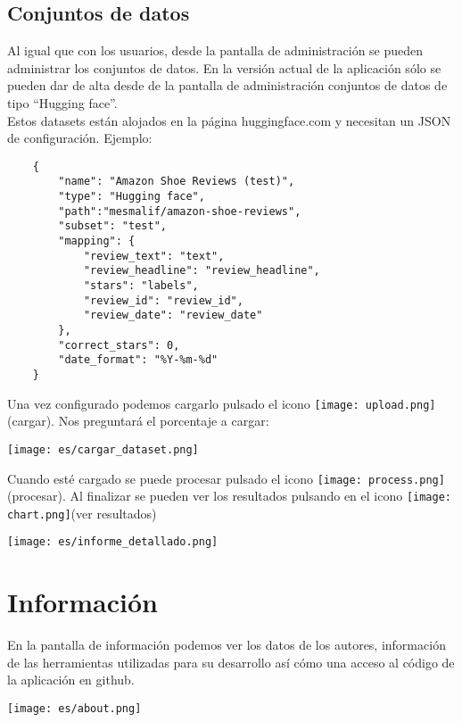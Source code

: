 \documentclass{ol-softwaremanual}
\begin{document}
\subsection{Conjuntos de datos}
Al igual que con los usuarios, desde la pantalla de administración se pueden administrar los conjuntos de datos.
En la versión actual de la aplicación sólo se pueden dar de alta desde de la pantalla de administración conjuntos de datos de tipo ``Hugging face''. \\Estos datasets están alojados en la página huggingface.com y necesitan un JSON de configuración.
Ejemplo:
\begin{verbatim}
    {         
        "name": "Amazon Shoe Reviews (test)",
        "type": "Hugging face",
        "path":"mesmalif/amazon-shoe-reviews",        
        "subset": "test",
        "mapping": {
            "review_text": "text",
            "review_headline": "review_headline",
            "stars": "labels",
            "review_id": "review_id",
            "review_date": "review_date"             
        },
        "correct_stars": 0,
        "date_format": "%Y-%m-%d"
    }
\end{verbatim}
Una vez configurado podemos cargarlo pulsado el icono \texttt{[image: upload.png]}(cargar).
Nos preguntará el porcentaje a cargar:

\vspace{20pt}
\centerline{\texttt{[image: es/cargar\_dataset.png]}}
\vspace{20pt}

Cuando esté cargado se puede procesar pulsado el icono \texttt{[image: process.png]}(procesar).
Al finalizar se pueden ver los resultados pulsando en el icono \texttt{[image: chart.png]}(ver resultados)

\vspace{20pt}
\centerline{\texttt{[image: es/informe\_detallado.png]}}
\vspace{20pt}
\newpage
\section{Información}
En la pantalla de información podemos ver los datos de los autores, información de las herramientas utilizadas para su desarrollo así cómo una acceso al código de la aplicación en github.

\vspace{20pt}
\centerline{\texttt{[image: es/about.png]}}
\vspace{20pt}
\end{document}
